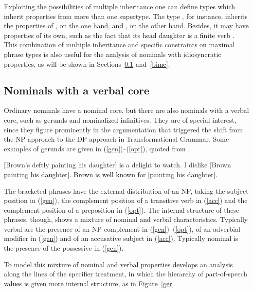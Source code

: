 \documentclass[output=paper
                ,modfonts
                ,nonflat
	        ,collection
	        ,collectionchapter
	        ,collectiontoclongg
 	        ,biblatex
                ,babelshorthands
                ,newtxmath
                ,draftmode
                ,colorlinks, citecolor=brown
]{./langsci/langscibook}
\begin{document}
Exploiting the possibilities of multiple inheritance one can 
define types which inherit properties from more than one supertype. 
The type , for instance, inherits 
the properties of , on the one hand, and 
, on the other hand. Besides, it may 
have properties of its own, such as the fact that its head daughter 
is a finite verb \citep[43]{GS00}. 
This combination of multiple inheritance and specific   
constraints on maximal phrase types is also useful for the analysis of 
nominals with idiosyncratic properties, as will be shown in Sections~\ref{geru} 
and~\ref{bime}. 


\subsection{Nominals with a verbal core} 
\label{geru}


Ordinary nominals have a nominal core, but there are also nominals  
with a verbal core, such as gerunds and nominalized infinitives. They are 
of special interest, since they figure prominently in the argumentation 
that triggered the shift from the NP approach to the DP approach in Transformational 
Grammar. Some examples of gerunds are given in (\ref{gen})--(\ref{opt}), 
quoted from \citet[1290]{Quirketal85}. 

\begin{exe} 
\ex\label{gen}  {}[Brown's deftly painting his daughter] is a delight to watch. 
\ex\label{acc}  I dislike [Brown painting his daughter]. 
\ex\label{opt}  Brown is well known for [painting his daughter].
\end{exe}

\noindent
The bracketed phrases have the external distribution of an NP, 
taking the subject position in (\ref{gen}), 
the complement position of a transitive verb in (\ref{acc}) and 
the complement position of a preposition in (\ref{opt}). 
The internal structure of these phrases, though, shows a mixture of nominal and verbal 
characteristics. 
Typically verbal are the presence of an NP complement in (\ref{gen})--(\ref{opt}), 
of an adverbial modifier in (\ref{gen}) and of an accusative subject in (\ref{acc}). 
Typically nominal is the presence of the possessive in (\ref{gen}). 

To model this mixture of nominal and verbal properties \citep[65]{Malouf00} 
develops an analysis along the lines of the specifier treatment, in which 
the hierarchy of part-of-speech values is given more internal structure, as in 
Figure~\ref{ger}. 
\end{document}
